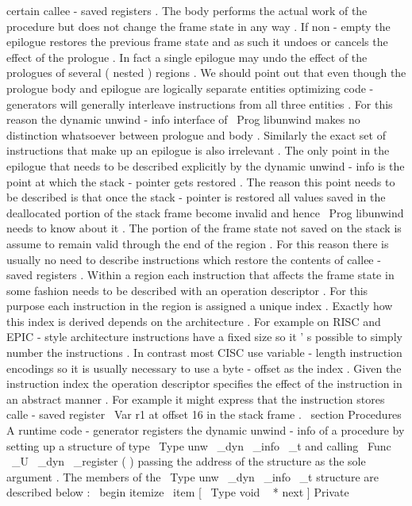 certain
callee
-
saved
registers
.
The
body
performs
the
actual
work
of
the
procedure
but
does
not
change
the
frame
state
in
any
way
.
If
non
-
empty
the
epilogue
restores
the
previous
frame
state
and
as
such
it
undoes
or
cancels
the
effect
of
the
prologue
.
In
fact
a
single
epilogue
may
undo
the
effect
of
the
prologues
of
several
(
nested
)
regions
.
We
should
point
out
that
even
though
the
prologue
body
and
epilogue
are
logically
separate
entities
optimizing
code
-
generators
will
generally
interleave
instructions
from
all
three
entities
.
For
this
reason
the
dynamic
unwind
-
info
interface
of
\
Prog
{
libunwind
}
makes
no
distinction
whatsoever
between
prologue
and
body
.
Similarly
the
exact
set
of
instructions
that
make
up
an
epilogue
is
also
irrelevant
.
The
only
point
in
the
epilogue
that
needs
to
be
described
explicitly
by
the
dynamic
unwind
-
info
is
the
point
at
which
the
stack
-
pointer
gets
restored
.
The
reason
this
point
needs
to
be
described
is
that
once
the
stack
-
pointer
is
restored
all
values
saved
in
the
deallocated
portion
of
the
stack
frame
become
invalid
and
hence
\
Prog
{
libunwind
}
needs
to
know
about
it
.
The
portion
of
the
frame
state
not
saved
on
the
stack
is
assume
to
remain
valid
through
the
end
of
the
region
.
For
this
reason
there
is
usually
no
need
to
describe
instructions
which
restore
the
contents
of
callee
-
saved
registers
.
Within
a
region
each
instruction
that
affects
the
frame
state
in
some
fashion
needs
to
be
described
with
an
operation
descriptor
.
For
this
purpose
each
instruction
in
the
region
is
assigned
a
unique
index
.
Exactly
how
this
index
is
derived
depends
on
the
architecture
.
For
example
on
RISC
and
EPIC
-
style
architecture
instructions
have
a
fixed
size
so
it
'
s
possible
to
simply
number
the
instructions
.
In
contrast
most
CISC
use
variable
-
length
instruction
encodings
so
it
is
usually
necessary
to
use
a
byte
-
offset
as
the
index
.
Given
the
instruction
index
the
operation
descriptor
specifies
the
effect
of
the
instruction
in
an
abstract
manner
.
For
example
it
might
express
that
the
instruction
stores
calle
-
saved
register
\
Var
{
r1
}
at
offset
16
in
the
stack
frame
.
\
section
{
Procedures
}
A
runtime
code
-
generator
registers
the
dynamic
unwind
-
info
of
a
procedure
by
setting
up
a
structure
of
type
\
Type
{
unw
\
_dyn
\
_info
\
_t
}
and
calling
\
Func
{
\
_U
\
_dyn
\
_register
}
(
)
passing
the
address
of
the
structure
as
the
sole
argument
.
The
members
of
the
\
Type
{
unw
\
_dyn
\
_info
\
_t
}
structure
are
described
below
:
\
begin
{
itemize
}
\
item
[
\
Type
{
void
~
*
}
next
]
Private
